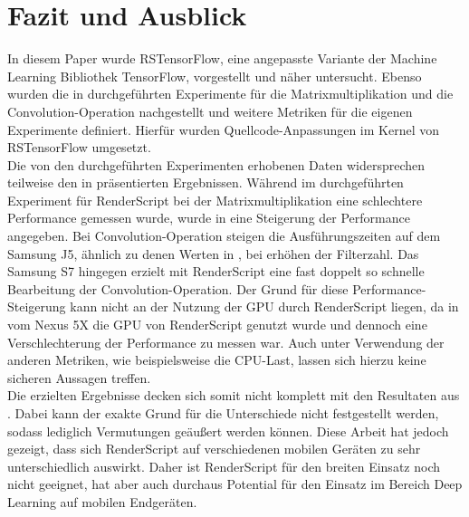 \section{Fazit und Ausblick}
\label{sec:ausblick}
In diesem Paper wurde RSTensorFlow, eine angepasste Variante der Machine Learning Bibliothek TensorFlow, vorgestellt und näher untersucht. Ebenso wurden die in \cite{rstensorflow2017} durchgeführten Experimente für die Matrixmultiplikation und die Convolution-Operation nachgestellt und weitere Metriken für die eigenen Experimente definiert. Hierfür wurden Quellcode-Anpassungen im Kernel von RSTensorFlow umgesetzt. 
\\
Die von den durchgeführten Experimenten erhobenen Daten widersprechen teilweise den in \cite{rstensorflow2017} präsentierten Ergebnissen. Während im durchgeführten Experiment für RenderScript bei der Matrixmultiplikation eine schlechtere Performance gemessen wurde, wurde in \cite{rstensorflow2017} eine Steigerung der Performance angegeben. Bei Convolution-Operation steigen die Ausführungszeiten auf dem Samsung J5, ähnlich zu denen Werten in \cite{rstensorflow2017}, bei erhöhen der Filterzahl. Das Samsung S7 hingegen erzielt mit RenderScript eine fast doppelt so schnelle Bearbeitung der Convolution-Operation. Der Grund für diese Performance-Steigerung kann nicht an der Nutzung der GPU durch RenderScript liegen, da in \cite{rstensorflow2017} vom Nexus 5X die GPU von RenderScript genutzt wurde und dennoch eine Verschlechterung der Performance zu messen war. Auch unter Verwendung der anderen Metriken, wie beispielsweise die CPU-Last, lassen sich hierzu keine sicheren Aussagen treffen.  
\\
Die erzielten Ergebnisse decken sich somit nicht komplett mit den Resultaten aus \cite{rstensorflow2017}. Dabei kann der exakte Grund für die Unterschiede nicht festgestellt werden, sodass lediglich Vermutungen geäußert werden können. Diese Arbeit hat jedoch gezeigt, dass sich RenderScript auf verschiedenen mobilen Geräten zu sehr unterschiedlich auswirkt. Daher ist RenderScript für den breiten Einsatz noch nicht geeignet, hat aber auch durchaus Potential für den Einsatz im Bereich Deep Learning auf mobilen Endgeräten. 